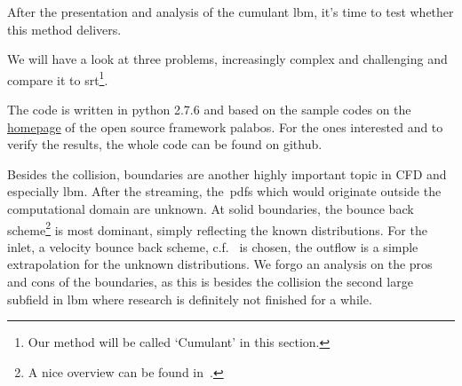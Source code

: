 After the presentation and analysis of the cumulant \gls{lbm}, it's time to test whether this method delivers.

We will have a look at three problems, increasingly complex and challenging and compare it to \gls{srt}\footnote{Our method will be called `Cumulant' in this section.}.

The code is written in python 2.7.6 and based on the sample codes on the \href{http://wiki.palabos.org/numerics:codes}{homepage} of the open source framework palabos.
For the ones interested and to verify the results, the whole code can be found on github.

Besides the collision, boundaries are another highly important topic in CFD and especially \gls{lbm}.
After the streaming, the~\glspl{pdf} which would originate outside the computational domain are unknown.
At solid boundaries, the bounce back scheme\footnote{A nice overview can be found in~\cite{boundaries}.} is most dominant, simply reflecting the known distributions.
For the inlet, a velocity bounce back scheme, c.f.~\cite{yu2003viscous} is chosen, the outflow is a simple extrapolation for the unknown distributions.
We forgo an analysis on the pros and cons of the boundaries, as this is besides the collision the second large subfield in \gls{lbm} where research is definitely not finished for a while.

